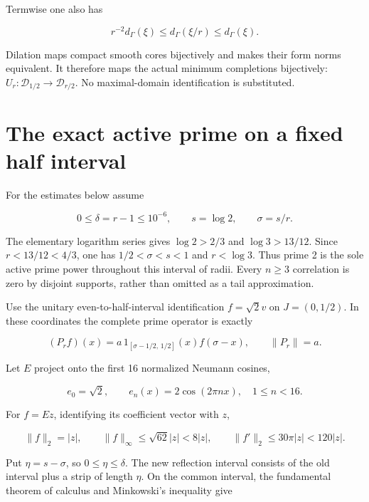 \documentclass[11pt]{article}
\begin{document}
Termwise one also has

\begin{equation}\label{a8}
r^{-2}d_\Gamma(\xi)\le d_\Gamma(\xi/r)\le d_\Gamma(\xi).
\end{equation}

Dilation maps compact smooth cores bijectively and makes their form norms equivalent. It therefore maps the actual minimum completions bijectively:
\(U_r:\mathcal D_{1/2}\to\mathcal D_{r/2}\). No maximal-domain identification is substituted.

\section{The exact active prime on a fixed half interval}

For the estimates below assume

\begin{equation}\label{a9}
0\le\delta=r-1\le10^{-6},\qquad s=\log2,\qquad \sigma=s/r.
\end{equation}

The elementary logarithm series gives \(\log2>2/3\) and \(\log3>13/12\). Since \(r<13/12<4/3\), one has \(1/2<\sigma<s<1\) and \(r<\log3\). Thus prime 2 is the sole active prime power throughout this interval of radii. Every \(n\ge3\) correlation is zero by disjoint supports, rather than omitted as a tail approximation.

Use the unitary even-to-half-interval identification \(f=\sqrt2v\) on \(J=(0,1/2)\). In these coordinates the complete prime operator is exactly

\begin{equation}\label{a10}
(P_rf)(x)=a\,1_{[\sigma-1/2,\,1/2]}(x)f(\sigma-x),
\qquad \|P_r\|=a.
\end{equation}

Let \(E\) project onto the first 16 normalized Neumann cosines,

\[
e_0=\sqrt2,\qquad e_n(x)=2\cos(2\pi n x),\quad 1\le n<16.
\]

For \(f=Ez\), identifying its coefficient vector with \(z\),

\begin{equation}\label{a11}
\|f\|_2=|z|,
\qquad \|f\|_\infty\le\sqrt{62}|z|<8|z|,
\qquad \|f'\|_2\le30\pi|z|<120|z|.
\end{equation}

Put \(\eta=s-\sigma\), so \(0\le\eta\le\delta\). The new reflection interval consists of the old interval plus a strip of length \(\eta\). On the common interval, the fundamental theorem of calculus and Minkowski's inequality give
\end{document}
